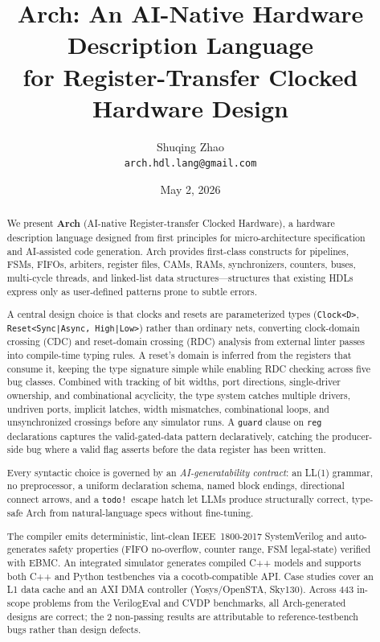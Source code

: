 \documentclass[11pt,twocolumn]{article}
\title{\textbf{Arch: An AI-Native Hardware Description Language\\for Register-Transfer Clocked Hardware Design}}
\author{
  Shuqing Zhao \\
  \texttt{arch.hdl.lang@gmail.com}
}
\date{May 2, 2026}
\begin{document}
\maketitle

\begin{abstract}
We present \textbf{Arch} (AI-native Register-transfer Clocked Hardware), a hardware description language designed from first principles for micro-architecture specification and AI-assisted code generation. Arch provides first-class constructs for pipelines, FSMs, FIFOs, arbiters, register files, CAMs, RAMs, synchronizers, counters, buses, multi-cycle threads, and linked-list data structures---structures that existing HDLs express only as user-defined patterns prone to subtle errors.

A central design choice is that clocks and resets are parameterized types (\texttt{Clock<D>}, \texttt{Reset<Sync|Async, High|Low>}) rather than ordinary nets, converting clock-domain crossing (CDC) and reset-domain crossing (RDC) analysis from external linter passes into compile-time typing rules. A reset's domain is inferred from the registers that consume it, keeping the type signature simple while enabling RDC checking across five bug classes. Combined with tracking of bit widths, port directions, single-driver ownership, and combinational acyclicity, the type system catches multiple drivers, undriven ports, implicit latches, width mismatches, combinational loops, and unsynchronized crossings before any simulator runs. A \texttt{guard} clause on \texttt{reg} declarations captures the valid-gated-data pattern declaratively, catching the producer-side bug where a valid flag asserts before the data register has been written.

Every syntactic choice is governed by an \emph{AI-generatability contract}: an LL(1) grammar, no preprocessor, a uniform declaration schema, named block endings, directional connect arrows, and a \texttt{todo!}\ escape hatch let LLMs produce structurally correct, type-safe Arch from natural-language specs without fine-tuning.

The compiler emits deterministic, lint-clean IEEE~1800-2017 SystemVerilog and auto-generates safety properties (FIFO no-overflow, counter range, FSM legal-state) verified with EBMC. An integrated simulator generates compiled C++ models and supports both C++ and Python testbenches via a cocotb-compatible API. Case studies cover an L1 data cache and an AXI DMA controller (Yosys/OpenSTA, Sky130). Across 443 in-scope problems from the VerilogEval and CVDP benchmarks, all Arch-generated designs are correct; the 2 non-passing results are attributable to reference-testbench bugs rather than design defects.
\end{abstract}
\end{document}
